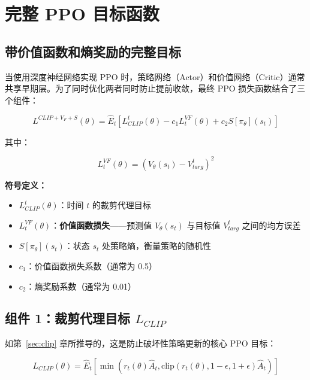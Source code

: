 \documentclass[12pt,a4paper]{article}
\theoremstyle{noteplain}
\theoremstyle{noteexercise}
\begin{document}
\section{完整 PPO 目标函数}\label{sec:full-obj}

\subsection{带价值函数和熵奖励的完整目标}

当使用深度神经网络实现 PPO 时，策略网络（Actor）和价值网络（Critic）通常共享早期层。为了同时优化两者同时防止提前收敛，最终 PPO 损失函数结合了三个组件：

\begin{equation}\label{eq:l-full}
  L^{CLIP+V_F+S}(\theta) = \hat{E}_t\left[L_{CLIP}^t(\theta) - c_1 L_t^{VF}(\theta) + c_2 S[\pi_\theta](s_t)\right]
\end{equation}

其中：

\begin{equation}\label{eq:l-vf}
  L_t^{VF}(\theta) = \left(V_\theta(s_t) - V_{targ}^t\right)^2
\end{equation}

\textbf{符号定义：}
\begin{itemize}
  \setlength{\itemsep}{0.2em}
  \item $L_{CLIP}^t(\theta)$：时间 $t$ 的裁剪代理目标
  \item $L_t^{VF}(\theta)$：\textbf{价值函数损失}——预测值 $V_\theta(s_t)$ 与目标值 $V_{targ}^t$ 之间的均方误差
  \item $S[\pi_\theta](s_t)$：状态 $s_t$ 处策略熵，衡量策略的随机性
  \item $c_1$：价值函数损失系数（通常为 0.5）
  \item $c_2$：熵奖励系数（通常为 0.01）
\end{itemize}

\subsection{组件 1：裁剪代理目标 $L_{CLIP}$}

如第~\ref{sec:clip} 章所推导的，这是防止破坏性策略更新的核心 PPO 目标：

\begin{equation}\label{eq:l-clip-ref}
  L_{CLIP}(\theta) = \hat{E}_t\left[\min\left(r_t(\theta)\hat{A}_t, \text{clip}\left(r_t(\theta), 1-\epsilon, 1+\epsilon\right)\hat{A}_t\right)\right]
\end{equation}
\end{document}
